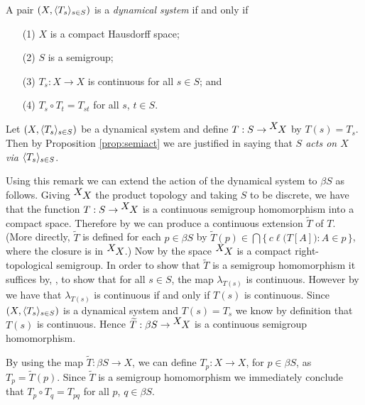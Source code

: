   \begin{defn}
    A pair $(X, \langle T_s \rangle_{s \in S})$ is a \textsl{dynamical system} if and only if
      \begin{itemize}
        \item[(1)] $X$ is a compact Hausdorff space;
        \item[(2)] $S$ is a semigroup;
        \item[(3)] $T_s : X \to X$ is continuous for all $s \in S$;
          and
        \item[(4)] $T_s \circ T_t = T_{st}$ for all $s$, $t \in S$.
      \end{itemize}
  \end{defn}

  \begin{rmk}
    Let $(X, \langle T_s \rangle_{s \in S})$ be a dynamical system and define $T : S \to
    \hbox{${}^{\hbox{$X$}}\hskip -1 pt X$}$ by $T(s) = T_s$.
    Then by Proposition \ref{prop:semiact} we are justified in saying
    that \textsl{$S$ acts on $X$ via $\langle T_s \rangle_{s \in S}$}.
  \end{rmk}

Using this remark we can extend the action of the dynamical system to
$\beta S$ as follows.
Giving $\hbox{${}^{\hbox{$X$}}\hskip -1 pt X$}$ the product topology and taking $S$ to be 
discrete, we have that the function $T :
S \to \hbox{${}^{\hbox{$X$}}\hskip -1 pt X$}$ is a continuous semigroup
homomorphism into a compact space.
Therefore by \cite[Theorem 3.27]{Hindman:1998fk} we can produce a
continuous extension $\widetilde{T}$ of $T$.
(More directly, $\widetilde{T}$ is defined for each $p \in \beta S$ by
$\widetilde{T}(p) \in \bigcap \{\, c\ell\bigl( T[A] \bigr) : A \in p \,\}$, where
the closure is in $\hbox{${}^{\hbox{$X$}}\hskip -1 pt X$}$.)
Now by \cite[Theorem 2.22(a)]{Hindman:1998fk} the space $\hbox{${}^{\hbox{$X$}}\hskip -1 pt X$}$ is
a compact right-topological semigroup.
In order to show that $\widetilde{T}$ is a semigroup homomorphism it
suffices by, \cite[Corollary 4.22]{Hindman:1998fk}, to show that for all
$s \in S$, the
map $\lambda_{T(s)}$ is continuous.
However by \cite[Theorem 2.2(b)]{Hindman:1998fk} we have that
$\lambda_{T(s)}$ is continuous if and only if $T(s)$ is continuous. 
Since $(X, \langle T_s \rangle_{s \in S})$ is a dynamical system and $T(s) = T_s$ we know by
definition that $T(s)$ is continuous. 
Hence $\widetilde{T} : \beta S \to \hbox{${}^{\hbox{$X$}}\hskip -1 pt X$}$ is a continuous semigroup
homomorphism.

  \begin{rmk}
    By using the map $\widetilde{T} : \beta S \to X$, we can define
    $T_p : X \to X$, for $p \in \beta S$, as $T_p =
    \widetilde{T}(p)$. 
    Since $\widetilde{T}$ is a semigroup homomorphism we immediately
    conclude that $T_p \circ T_q = T_{pq}$ for all $p$, $q \in \beta
    S$.
   \end{rmk}


